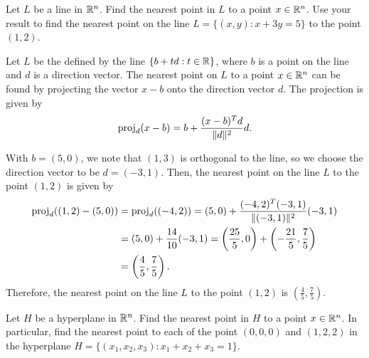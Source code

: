 \begin{exercise}
  Let $L$ be a line in $\mathbb{R}^n$.
  Find the nearest point in $L$ to a point $x \in \mathbb{R}^n$.
  Use your result to find the nearest point on the line $L = \{ (x, y) : x + 3y = 5 \}$ to the point $(1, 2)$.
\end{exercise}

\begin{solution}
  Let $L$ be the defined by the line $\{ b + t d : t \in \mathbb{R} \}$, where $b$ is a point on the line and $d$ is a direction vector.
  The nearest point on $L$ to a point $x \in \mathbb{R}^n$ can be found by projecting the vector $x - b$ onto the direction vector $d$.
  The projection is given by
  \begin{equation}
    \mathrm{proj}_d (x - b) = b + \frac{(x - b)^T d}{\lVert d\rVert^2} d.
  \end{equation}

  With $b = (5, 0)$, we note that $(1, 3)$ is orthogonal to the line, so we choose the direction vector to be $d = (-3, 1)$.
  Then, the nearest point on the line $L$ to the point $(1, 2)$ is given by
  \begin{equation}
    \begin{split}
      \mathrm{proj}_d ((1, 2) - (5, 0)) &= \mathrm{proj}_d ((-4, 2))
      = (5, 0) + \frac{(-4, 2)^T (-3, 1)}{\lVert(-3, 1)\rVert^2} (-3, 1) \\
      &= (5, 0) + \frac{14}{10} (-3, 1)
      =\left(\frac{25}{5}, 0\right) + \left(-\frac{21}{5}, \frac{7}{5}\right) \\
      &= \left(\frac{4}{5}, \frac{7}{5}\right).
    \end{split}
  \end{equation}
  Therefore, the nearest point on the line $L$ to the point $(1, 2)$ is $\left(\frac{4}{5}, \frac{7}{5}\right)$.
\end{solution}

\begin{exercise}
  Let $H$ be a hyperplane in $\mathbb{R}^n$.
  Find the nearest point in $H$ to a point $x \in \mathbb{R}^n$.
  In particular, find the nearest point to each of the point $(0,0,0)$ and $(1,2,2)$ in the hyperplane $H = \{ (x_1, x_2, x_3) : x_1 + x_2 + x_3 = 1 \}$.
\end{exercise}

